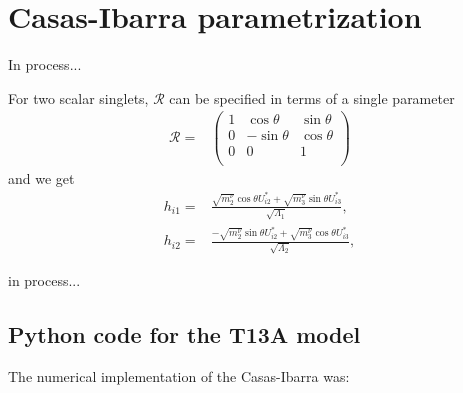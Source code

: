 \section{Casas-Ibarra parametrization}
\label{sec:casas-ibarra}

In process...
 
{\color{red}
For two scalar singlets, $\boldsymbol{\mathcal{R}}$ can be specified in terms of a single parameter 
\begin{align}
  \boldsymbol{\mathcal{R}}=&
  \begin{pmatrix}
    1 & \cos\theta & \sin\theta\\
    0 & -\sin\theta & \cos\theta\\
    0 &   0        & 1         \\ 
  \end{pmatrix}
\end{align}
and we get
\begin{align}
  h_{i1}=&\frac{\sqrt{m^\nu_2}\cos\theta U^{*}_{i2}+ \sqrt{m^\nu_3}\sin\theta U^{*}_{i3}}%
{\sqrt{\Lambda_1}},\nonumber\\
h_{i2}=&\frac{-\sqrt{m^\nu_2}\sin\theta U^{*}_{i2}+ \sqrt{m^\nu_3}\cos\theta U^{*}_{i3}}%
{\sqrt{\Lambda_2}},
\end{align}
}

in process...

\subsection{Python code for the T13A model}
The numerical implementation of the Casas-Ibarra was: